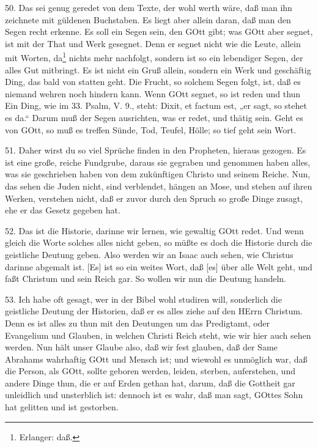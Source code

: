50. Das sei genug geredet von dem Texte, der wohl werth wäre, daß man ihn zeichnete mit güldenen Buchstaben. Es liegt aber allein daran, daß man den Segen recht erkenne. Es soll ein Segen sein, den GOtt gibt; was GOtt aber segnet, ist mit der That und Werk gesegnet. Denn er segnet nicht wie die Leute, allein mit Worten, da\footnote{Erlanger: daß.} nichts mehr nachfolgt, sondern ist so ein lebendiger Segen, der alles Gut mitbringt. Es ist nicht ein Gruß allein, sondern ein Werk und geschäftig Ding, das bald von statten geht. Die Frucht, so solchem Segen folgt, ist, daß es niemand wehren noch hindern kann. Wenn GOtt segnet, so ist reden und thun Ein Ding, wie im 33. Psalm, V. 9., steht: Dixit, et factum est, „er sagt, so stehet es da.“ Darum muß der Segen ausrichten, was er redet, und thätig sein. Geht es von GOtt, so muß es treffen Sünde, Tod, Teufel, Hölle; so tief geht sein Wort.

51. Daher wirst du so viel Sprüche finden in den Propheten, hieraus gezogen. Es ist eine große, reiche Fundgrube, daraus sie gegraben und genommen haben alles, was sie geschrieben haben von dem zukünftigen Christo und seinem Reiche. Nun, das sehen die Juden nicht, sind verblendet, hängen an Mose, und stehen auf ihren Werken, verstehen nicht, daß er zuvor durch den Spruch so große Dinge zusagt, ehe er das Gesetz gegeben hat.

52. Das ist die Historie, darinne wir lernen, wie gewaltig GOtt redet. Und wenn gleich die Worte solches alles nicht geben, so müßte es doch die Historie durch die geistliche Deutung geben. Also werden wir an Isaac auch sehen, wie Christus darinne abgemalt ist. [Es] ist so ein weites Wort, daß [es] über alle Welt geht, und faßt Christum und sein Reich gar. So wollen wir nun die Deutung handeln.

53. Ich habe oft gesagt, wer in der Bibel wohl studiren will, sonderlich die geistliche Deutung der Historien, daß er es alles ziehe auf den HErrn Christum. Denn es ist alles zu thun mit den Deutungen um das Predigtamt, oder Evangelium und Glauben, in welchen Christi Reich steht, wie wir hier auch sehen werden. Nun hält unser Glaube also, daß wir fest glauben, daß der Same Abrahams wahrhaftig GOtt und Mensch ist; und wiewohl es unmöglich war, daß die Person, als GOtt, sollte geboren werden, leiden, sterben, auferstehen, und andere Dinge thun, die er auf Erden gethan hat, darum, daß
die Gottheit gar unleidlich und unsterblich ist: dennoch ist es wahr, daß man sagt, GOttes Sohn hat gelitten und ist gestorben.

